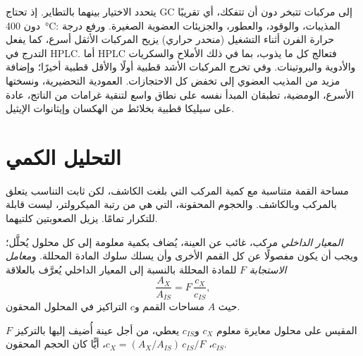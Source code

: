 يتحدد الاختيار بينهما بالتطاير. إذ تحتاج GC إلى مركبات تتبخر دون أن تتفكك،
أي تقريبًا دون \qty{400}{\degreeCelsius}: المذيبات، والوقود، والعطور، والجزيئات العضوية الصغيرة. ورفع
درجة حرارة الفرن أثناء التشغيل (منحدر حراري) يزيح المركبات الأثقل أسرع، كما يفعل التدرج
في HPLC. أما HPLC فتعالج كل ما يذوب، بما في ذلك الأملاح والسكريات والأدوية والبروتينات. وفي
 تخرج المركبات الأشد قطبية أولًا والأقل قطبية أخيرًا؛ وإضافة مزيد من المذيب
العضوي إلى  تخفض كل الاحتجازات.  العمودية التحضيرية، ونسختها الأسرع،
 الومضية، تطبقان المبدأ نفسه على نطاق واسع لتنقية غرامات من الناتج،
عادة على سيليكا قطبية بخلائط من الهكسان وإيثانوات الإيثيل.

\section{التحليل الكمي}

مساحة القمة متناسبة مع كمية المركب التي بلغت الكاشف، لكن
ثابت التناسب يتعلق بالمركب وبالكاشف. والحجوم المحقونة، التي هي من رتبة
الميكرولتر، ليست قابلة للتكرار تمامًا.  يزيل الصعوبتين كلتيهما.

\begin{definition}\label{def:b2:chromatography:quantitative}
\emph{المعيار الداخلي} مركب، غائب عن العينة، يُضاف بكمية
معلومة إلى كل محلول يُحلَّل؛ ويجب أن يكون مفصولًا عن كل القمم الأخرى وأن يسلك سلوك
المادة المحللة. و\emph{معامل الاستجابة} $F$ للمادة المحللة بالنسبة إلى المعيار
الداخلي يُعرَّف بالعلاقة
\begin{equation*}
\frac{A_X}{A_{IS}} = F\,\frac{c_X}{c_{IS}},
\end{equation*}
حيث $A$ مساحات القمم و$c$ التراكيز في المحلول المحقون.
\end{definition}

\begin{proposition}\label{prop:b2:chromatography:internal-standard}
$F$ المقيس على محلول معايرة معلوم $c_X$ و$c_{IS}$ يعطي، من أجل عينة أُضيف إليها
 بالتركيز $c_{IS}$، $c_X = (A_X/A_{IS})\,c_{IS}/F$، أيًّا كان الحجم المحقون.
\end{proposition}

